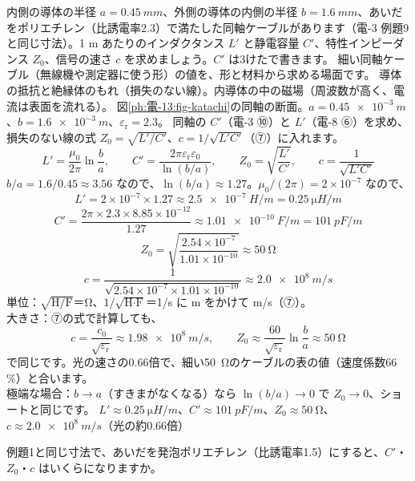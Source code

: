 \label{ph:電-13:ex1}
\begin{phreidai}[同軸ケーブルの $L'$・$C'$・$Z_0$・速さ]
内側の導体の半径 $a=\qty{0.45}{mm}$、外側の導体の内側の半径 $b=\qty{1.6}{mm}$、あいだをポリエチレン（比誘電率2.3）で満たした同軸ケーブルがあります（電-3 例題9 と同じ寸法）。1 m あたりのインダクタンス $L'$ と静電容量 $C'$、特性インピーダンス $Z_0$、信号の速さ $c$ を求めましょう。$C'$ は3けたで書きます。
\phbamen
細い同軸ケーブル（無線機や測定器に使う形）の値を、形と材料から求める場面です。
\phmushi
導体の抵抗と絶縁体のもれ（損失のない線）。内導体の中の磁場（周波数が高く、電流は表面を流れる）。
\phzu
図\ref{ph:電-13:fig-katachi}の同軸の断面。$a=\qty{0.45e-3}{m}$、$b=\qty{1.6e-3}{m}$、$\varepsilon_{\mathrm r}=2.3$。
\phriyu
同軸の $C'$（電-3 ⑩）と $L'$（電-8 ⑥）を求め、損失のない線の式 $Z_0=\sqrt{L'/C'}$、$c=1/\sqrt{L'C'}$（⑦）に入れます。
\phtateru
\[L'=\frac{\mu_0}{2\pi}\ln\frac ba,\qquad C'=\frac{2\pi\varepsilon_{\mathrm r}\varepsilon_0}{\ln(b/a)},\qquad Z_0=\sqrt{\frac{L'}{C'}},\qquad c=\frac{1}{\sqrt{L'C'}}\]
\phtoku
$b/a=1.6/0.45\approx3.56$ なので、$\ln(b/a)\approx1.27$。$\mu_0/(2\pi)=2\times10^{-7}$ なので、
\[L'=2\times10^{-7}\times1.27\approx\qty{2.5e-7}{H/m}=\qty{0.25}{\micro H/m}\]
\[C'=\frac{2\pi\times2.3\times8.85\times10^{-12}}{1.27}\approx\qty{1.01e-10}{F/m}=\qty{101}{pF/m}\]
\[Z_0=\sqrt{\frac{2.54\times10^{-7}}{1.01\times10^{-10}}}\approx\qty{50}{\ohm}\]
\[c=\frac{1}{\sqrt{2.54\times10^{-7}\times1.01\times10^{-10}}}\approx\qty{2.0e8}{m/s}\]
\phtashikame
単位：$\sqrt{\text{H/F}}$＝Ω、$1/\sqrt{\text{H·F}}$＝1/s に m をかけて m/s（⑦）。\\
大きさ：⑦の式で計算しても、
\[c=\frac{c_0}{\sqrt{\varepsilon_{\mathrm r}}}\approx\qty{1.98e8}{m/s},\qquad Z_0\approx\frac{60}{\sqrt{\varepsilon_{\mathrm r}}}\ln\frac ba\approx\qty{50}{\ohm}\]
で同じです。光の速さの0.66倍で、細い\qty{50}{\ohm}のケーブルの表の値（速度係数66\,\%）と合います。\\
極端な場合：$b\to a$（すきまがなくなる）なら $\ln(b/a)\to0$ で $Z_0\to0$、ショートと同じです。
\kotae $L'\approx\qty{0.25}{\micro H/m}$、$C'\approx\qty{101}{pF/m}$、$Z_0\approx\qty{50}{\ohm}$、$c\approx\qty{2.0e8}{m/s}$（光の約0.66倍）
\end{phreidai}
\begin{jibun}
例題1と同じ寸法で、あいだを発泡ポリエチレン（比誘電率1.5）にすると、$C'$・$Z_0$・$c$ はいくらになりますか。
\end{jibun}

